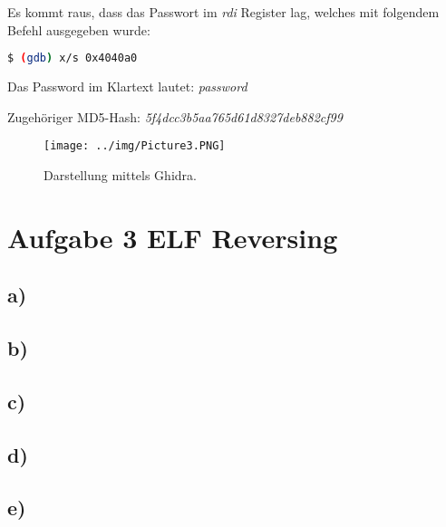 Es kommt raus, dass das Passwort im \textit{rdi} Register lag, welches mit folgendem Befehl ausgegeben wurde:

\begin{lstlisting}[language=bash]
    $ (gdb) x/s 0x4040a0
\end{lstlisting}

Das Password im Klartext lautet: \textit{password}

Zugehöriger MD5-Hash: \textit{5f4dcc3b5aa765d61d8327deb882cf99}

\begin{figure} [!ht]
\centering
\texttt{[image: ../img/Picture3.PNG]}
\caption{Darstellung mittels Ghidra.}
\end{figure}

\newpage

\section*{Aufgabe 3 ELF Reversing}

\subsection*{a)}

\subsection*{b)}

\subsection*{c)}

\subsection*{d)}

\subsection*{e)}

